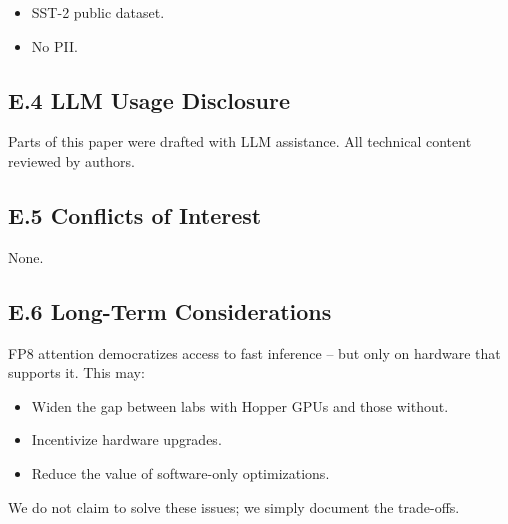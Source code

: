 \begin{itemize}
\item SST-2 public dataset.
\item No PII.

\end{itemize}
\subsection{E.4 LLM Usage Disclosure}

Parts of this paper were drafted with LLM assistance. All technical content 
reviewed by authors.

\subsection{E.5 Conflicts of Interest}

None.

\subsection{E.6 Long-Term Considerations}

FP8 attention democratizes access to fast inference -- but only on hardware 
that supports it. This may:

\begin{itemize}
\item Widen the gap between labs with Hopper GPUs and those without.
\item Incentivize hardware upgrades.
\item Reduce the value of software-only optimizations.

\end{itemize}
We do not claim to solve these issues; we simply document the trade-offs.

